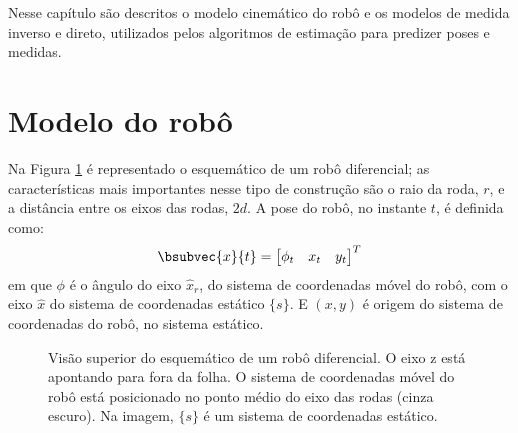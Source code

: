 Nesse capítulo  são descritos o modelo 
cinemático do robô e os modelos de medida inverso e direto, utilizados pelos algoritmos de estimação para predizer poses e medidas.

\section{Modelo do robô}
Na Figura \ref{fig:diff-drive-schematic} é representado o esquemático de um robô diferencial; as características mais importantes nesse tipo de construção 
são o raio da roda, $r$, e a distância entre os eixos das rodas, $2d$. A 
pose do robô, no instante $t$, é definida como:
\begin{equation}
  \bsubvec{x}{t} = \begin{bmatrix}
    \phi_t & x_t & y_t
  \end{bmatrix}^T
  \label{eq:robot-pose}
\end{equation}
em que $\phi$ é o ângulo do eixo $\hat{x}_r$, do sistema de coordenadas móvel 
do robô, com o eixo $\hat{x}$ do sistema de coordenadas estático $\{s\}$. E $(x, y)$ é origem do sistema de coordenadas do robô, no sistema estático.
\begin{figure}[h]
  \centering
  
  \caption[Esquemático de um robô diferencial]{Visão superior do esquemático de um robô diferencial. O eixo z está apontando para fora 
  da folha. O sistema de coordenadas móvel do robô está posicionado no ponto médio do eixo das rodas  (cinza escuro). Na imagem, $\{s\}$ é um sistema de coordenadas estático.}
  \label{fig:diff-drive-schematic}
\end{figure}

